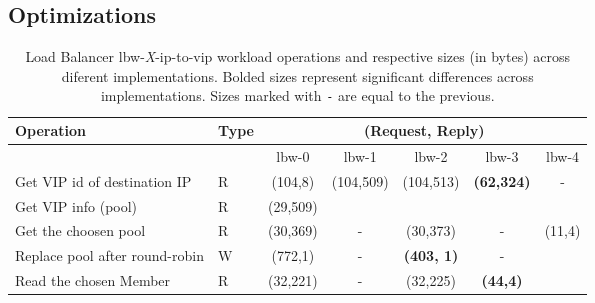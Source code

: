 \subsection{Optimizations}
\begin{table}[ht]
\small
\begin{tabular}{llccccc}
 Operation & Type &  \multicolumn{5}{c}{ (Request, Reply) } \\  \midrule
&  & lbw-0 & lbw-1  & lbw-2 & lbw-3 & lbw-4 \\ \toprule 
Get VIP id of destination IP  & R & (104,8) &\multirow{2}{*}{(104,509)} &  \multirow{2}{*}{(104,513)} &\multirow{2}{*}{\textbf{(62,324)}} & \multirow{2}{*}{-}    \\\cmidrule{1-2} 
Get VIP info (pool)   & R &  (29,509) & & & &   \\ \midrule 
Get the choosen pool  & R & (30,369)  &  - & (30,373) & -   & \multirow{3}{*}[-2mm]{(11,4)}  \\  \cmidrule{1-2} 
Replace pool after round-robin  & W & (772,1) & -
&\textbf{(403, 1)} &  - \\ \cmidrule{1-2}  
  Read the chosen Member &  R & (32,221) & - & (32,225) & \textbf{(44,4)} & \\\bottomrule  
\end{tabular}\caption[Load Balancer IP to VIP workload operations across
diferent implementations.]{Load Balancer  lbw-\textit{X}-ip-to-vip workload
  operations and respective sizes (in bytes) across diferent
  implementations. Bolded sizes represent significant differences
  across implementations. Sizes marked with \texttt{-} are equal to
  the previous. }\label{table:lbw:optimizations}
\end{table}

